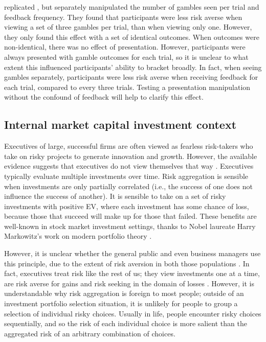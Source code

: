 \documentclass[a4paper, nobind, dvipsnames]{templates/ociamthesis}
\theoremstyle{definition}
\theoremstyle{definition}
\theoremstyle{definition}
\theoremstyle{definition}
\theoremstyle{remark}
\begin{document}
\textcite{moher2010} replicated \textcite{gneezy1997}, but separately manipulated the number of
gambles seen per trial and feedback frequency. They found that participants were
less risk averse when viewing a set of three gambles per trial, than when
viewing only one. However, they only found this effect with a set of identical
outcomes. When outcomes were non-identical, there was no effect of presentation.
However, participants were always presented with gamble outcomes for each trial,
so it is unclear to what extent this influenced participants' ability to bracket
broadly. In fact, when seeing gambles separately, participants were less risk
averse when receiving feedback for each trial, compared to every three trials.
Testing a presentation manipulation without the confound of feedback will help
to clarify this effect.

\hypertarget{internal-market-capital-investment-context}{%
\subsection{Internal market capital investment context}\label{internal-market-capital-investment-context}}

Executives of large, successful firms are often viewed as fearless risk-takers
who take on risky projects to generate innovation and growth. However, the
available evidence suggests that executives do not view themselves that way
\autocite{swalm1966,march1987}. Executives typically evaluate multiple investments
over time. Risk aggregation is sensible when investments are only partially
correlated (i.e., the success of one does not influence the success of another).
It is sensible to take on a set of risky investments with positive EV, where
each investment has some chance of loss, because those that succeed will make up
for those that failed. These benefits are well-known in stock market investment
settings, thanks to Nobel laureate Harry Markowitz's work on modern portfolio
theory \autocite*{markowitz1952}.

However, it is unclear whether the general public and even business managers use
this principle, due to the extent of risk aversion in both those populations
\autocites[e.g.,][]{tversky1992,march1987}. In fact, executives treat risk like the rest
of us; they view investments one at a time, are risk averse for gains and risk
seeking in the domain of losses \autocite{maccrimmon1986,swalm1966,lovallo2020}.
However, it is understandable why risk aggregation is foreign to most people;
outside of an investment portfolio selection situation, it is unlikely for
people to group a selection of individual risky choices. Usually in life, people
encounter risky choices sequentially, and so the risk of each individual choice
is more salient than the aggregated risk of an arbitrary combination of choices.
\end{document}
